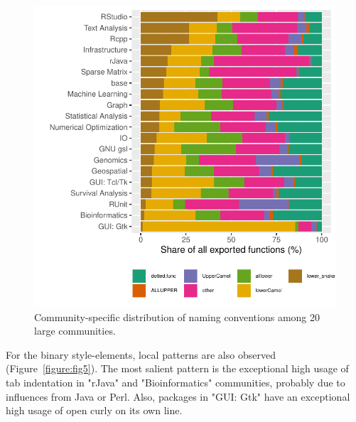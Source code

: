 \begin{figure}[htbp]
  \centering
  \includegraphics{fig4}
  \caption{Community-specific distribution of naming conventions among 20 large communities.}
  \label{figure:fig4}
\end{figure}

For the binary style-elements, local patterns are also observed (Figure~\ref{figure:fig5}). The most salient pattern is the exceptional high usage of tab indentation in "rJava" and "Bioinformatics" communities, probably due to influences from Java or Perl. Also, packages in "GUI: Gtk" have an exceptional high usage of open curly on its own line.

